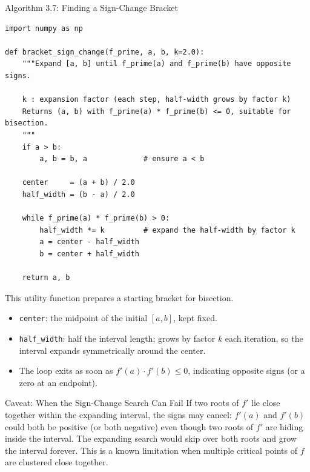 \documentclass[aspectratio=169,10pt]{beamer}
\begin{document}
\begin{frame}[fragile]{Algorithm 3.7: Finding a Sign-Change Bracket}
\begin{lstlisting}[style=pycode,
  caption={Python: Expand [a, b] symmetrically until f\_prime has a sign change}]
import numpy as np

def bracket_sign_change(f_prime, a, b, k=2.0):
    """Expand [a, b] until f_prime(a) and f_prime(b) have opposite signs.

    k : expansion factor (each step, half-width grows by factor k)
    Returns (a, b) with f_prime(a) * f_prime(b) <= 0, suitable for bisection.
    """
    if a > b:
        a, b = b, a             # ensure a < b

    center     = (a + b) / 2.0
    half_width = (b - a) / 2.0

    while f_prime(a) * f_prime(b) > 0:
        half_width *= k         # expand the half-width by factor k
        a = center - half_width
        b = center + half_width

    return a, b
\end{lstlisting}

  \medskip
  This utility function prepares a starting bracket for bisection.
  \begin{itemize}
    \item \texttt{center}: the midpoint of the initial $[a, b]$, kept fixed.
    \item \texttt{half\_width}: half the interval length; grows by factor $k$
          each iteration, so the interval expands symmetrically around the center.
    \item The loop exits as soon as $f'(a) \cdot f'(b) \le 0$, indicating
          opposite signs (or a zero at an endpoint).
  \end{itemize}

  \begin{alertblock}{Caveat: When the Sign-Change Search Can Fail}
    If two roots of $f'$ lie close together within the expanding interval,
    the signs may cancel: $f'(a)$ and $f'(b)$ could both be positive (or
    both negative) even though two roots of $f'$ are hiding inside the
    interval.  The expanding search would skip over both roots and grow
    the interval forever.  This is a known limitation when multiple critical
    points of $f$ are clustered close together.
  \end{alertblock}
\end{frame}
\end{document}
